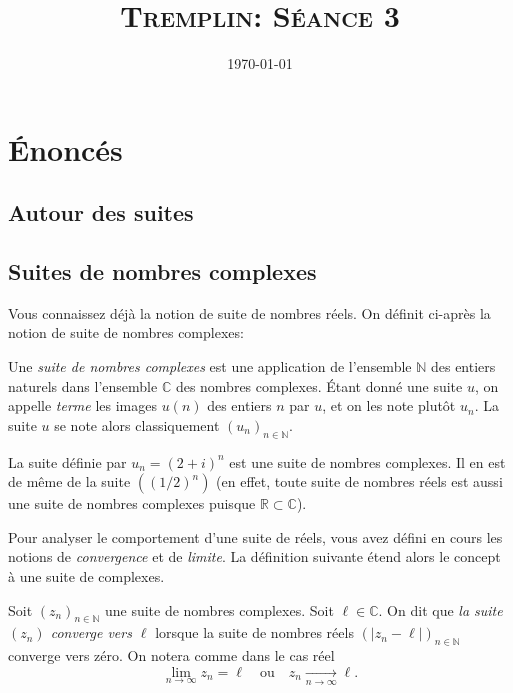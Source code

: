\documentclass[12pt]{article}
\title{\textsc{Tremplin: Séance 3}}
\date{\today}
\author{}
\newcommand{\RR}{\mathbb R}
\newcommand{\CC}{\mathbb C}
\newcommand{\NN}{\mathbb N}
\theoremstyle{definition}
\begin{document}
\maketitle

\section*{Énoncés}

\subsection*{Autour des suites}

\begin{exer}
	
\end{exer}

\subsection*{Suites de nombres complexes}

Vous connaissez déjà la notion de suite de nombres réels. On définit ci-après la notion de suite de nombres complexes:
\begin{defn}
Une \textit{suite de nombres complexes} est une application de l'ensemble $\NN$ des entiers naturels dans l'ensemble $\CC$ des nombres complexes. Étant donné une suite $u$, on appelle \textit{terme} les images $u(n)$ des entiers $n$ par $u$, et on les note plutôt $u_n$. La suite $u$ se note alors classiquement $(u_n)_{n\in\NN}$.
\end{defn}

\begin{exem}
La suite définie par $u_n = (2+i)^n$ est une suite de nombres complexes. Il en est de même de la suite $\left((1/2)^n\right)$ (en effet, toute suite de nombres réels est aussi une suite de nombres complexes puisque $\RR\subset \CC$).
\end{exem}

Pour analyser le comportement d'une suite de réels, vous avez défini en cours les notions de \textit{convergence} et de \textit{limite}. La définition suivante étend alors le concept à une suite de complexes.

\begin{defn}
Soit $(z_n)_{n\in\NN}$ une suite de nombres complexes. Soit $\ell \in\CC$. On dit que \textit{la suite $(z_n)$ converge vers $\ell$} lorsque la suite de nombres réels
$\left(
|z_n -\ell|\right)_{n\in\NN}
$
converge vers zéro. On notera comme dans le cas réel
\[
\lim_{n\to\infty}z_n = \ell \quad\text{ou}\quad z_n \xrightarrow[n\to\infty]{}\ell.
\]
\end{defn}
\end{document}
